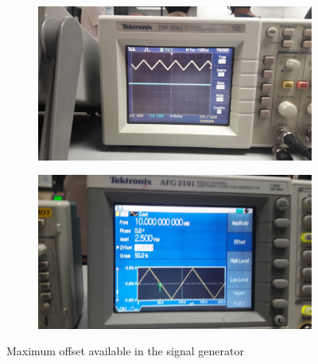 \documentclass[letterpaper]{article}
\begin{document}
\begin{figure}[H]
    \begin{subfigure}{0.55\textwidth}
        \includegraphics[width=.95\linewidth]{img/part2/13}
    \end{subfigure}
    \begin{subfigure}{0.55\textwidth}
        \includegraphics[width=.95\linewidth]{img/part2/14}
    \end{subfigure}
    \caption{Maximum offset available in the signal generator}
\end{figure}
\end{document}
